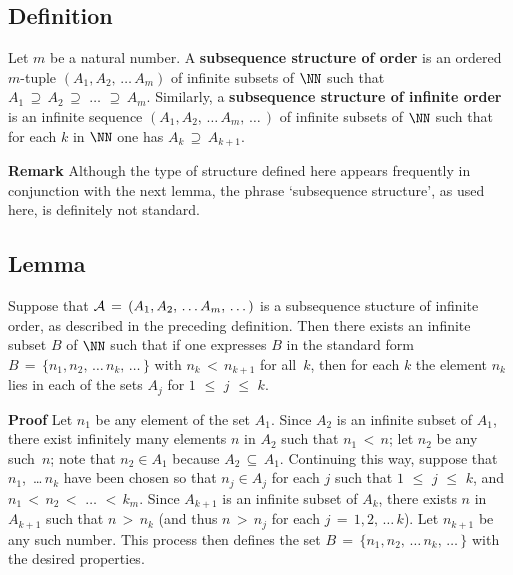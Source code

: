 {        \subsection{\small{{\bf Definition}}}
        \label{DefA40.45}

\V

        Let $m$ be a natural number. A {\bf subsequence structure of order } is an ordered $m$-tuple $(A_{1}, A_{2},\,{\ldots}\,A_{m})$
    of infinite subsets of ${\NN}$ such that $A_{1} \,{\supseteq}\, A_{2} \,{\supseteq}\, \,{\ldots}\, \,{\supseteq}\, A_{m}$.
    Similarly, a {\bf subsequence structure of infinite order} is an infinite sequence $(A_{1}, A_{2},\,{\ldots}\,A_{m},\,{\ldots}\,)$
    of infinite subsets of ${\NN}$ such that for each $k$ in ${\NN}$ one has $A_{k} \,{\supseteq}\, A_{k+1}$.

\V

        {\bf Remark} Although the type of structure defined here appears frequently in conjunction with the next lemma,
    the phrase `subsequence structure', as used here, is definitely not standard.

\VV


        \subsection{\small{{\bf Lemma}}}
        \label{LemmaA40.50}

\V

        Suppose that ${\cal A} \,=\, (A_{1}, A_{2},\,{\ldots}\,A_{m},\,{\ldots}\,)$
    is a subsequence stucture of infinite order, as described in the preceding definition.
    Then there exists an infinite subset $B$ of ${\NN}$ such that if one expresses $B$ in the standard form
    $B \,=\,\{n_{1}, n_{2}, \,{\ldots}\,n_{k},\,{\ldots}\,\}$ with $n_{k}\,<\,n_{k+1}$ for all~$k$,
    then for each $k$ the element $n_{k}$ lies in each of the sets $A_{j}$ for $1\,\,{\leq}\,\,j\,\,{\leq}\,\,k$.

\V

        {\bf Proof} Let $n_{1}$ be any element of the set $A_{1}$. Since $A_{2}$ is an infinite subset of $A_{1}$,
    there exist infinitely many elements $n$ in $A_{2}$ such that $n_{1}\,<\,n$; let $n_{2}$ be any such~$n$;
    note that $n_{2}{\in}A_{1}$ because $A_{2} \,{\subseteq}\, A_{1}$. Continuing this way, suppose that
    $n_{1}$, \,{\ldots}\,$n_{k}$ have been chosen so that $n_{j}{\in}A_{j}$ for each $j$ such that $1\,\,{\leq}\,\,j\,\,{\leq}\,\,k$,
    and $n_{1}\,<\,n_{2}\,<\,\,{\ldots}\,\,<\,k_{m}$.
    Since $A_{k+1}$ is an infinite subset of $A_{k}$, there exists $n$ in $A_{k+1}$ such that
    $n\,>\,n_{k}$ (and thus $n\,>\,n_{j}$ for each $j \,=\, 1,2,\,{\ldots}\,k$). Let $n_{k+1}$ be any such number.
    This process then defines the set $B \,=\, \{n_{1}, n_{2},\,{\ldots}\,n_{k},\,{\ldots}\,\}$ with the desired properties.

}
